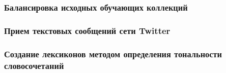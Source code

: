     \subsubsection{Балансировка исходных обучающих коллекций}

    \subsubsection{Прием текстовых сообщений сети Twitter}

    \subsubsection{Создание лексиконов методом определения тональности словосочетаний}


